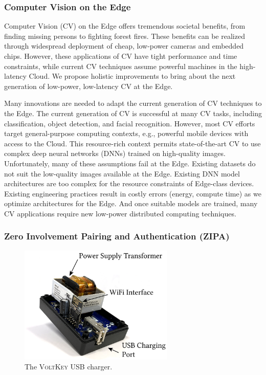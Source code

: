 \documentclass[10pt,onecolumn]{article}
\begin{document}
\subsubsection{Computer Vision on the Edge}


Computer Vision (CV) on the Edge offers tremendous societal benefits, from finding missing persons to fighting forest fires.
These benefits can be realized through widespread deployment of cheap, low-power cameras and embedded chips.
However, these applications of CV have tight performance and time constraints, while current CV techniques assume powerful machines in the high-latency Cloud.
We propose holistic improvements to bring about the next generation of low-power, low-latency CV at the Edge.

Many innovations are needed to adapt the current generation of CV techniques to the Edge.
The current generation of CV is successful at many CV tasks, including classification, object detection, and facial recognition.
However, most CV efforts target general-purpose computing contexts, e.g., powerful mobile devices with access to the Cloud.
This resource-rich context permits state-of-the-art CV to use complex deep neural networks (DNNs) trained on high-quality images.
Unfortunately, many of these assumptions fail at the Edge.
Existing datasets do not suit the low-quality images available at the Edge.
Existing DNN model architectures are too complex for the resource constraints of Edge-class devices.
Existing engineering practices result in costly errors (energy, compute time) as we optimize architectures for the Edge.
And once suitable models are trained, many CV applications require new low-power distributed computing techniques.



\subsubsection{Zero Involvement Pairing and Authentication (ZIPA)}

\begin{figure}
\centering
\includegraphics[width=2.9in]{figures/voltkey.png}
\caption{The \textsc{VoltKey} USB charger.}
\label{fig:voltkey}
\end{figure}
\end{document}
